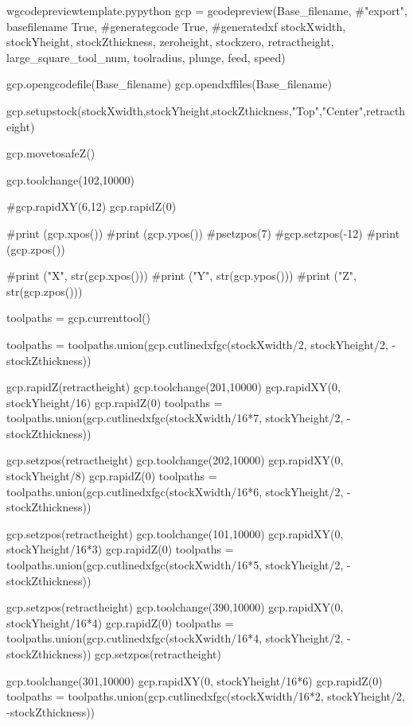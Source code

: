 \documentclass{ltxdoc}
\begin{document}
\begin{writecode}{w}{gcodepreviewtemplate.py}{python}
gcp = gcodepreview(Base_filename, #"export", basefilename
                   True, #generategcode
                   True, #generatedxf
                   stockXwidth, 
                   stockYheight, 
                   stockZthickness, 
                   zeroheight, 
                   stockzero, 
                   retractheight, 
                   large_square_tool_num,
                   toolradius,
                   plunge,
                   feed,
                   speed)

gcp.opengcodefile(Base_filename)
gcp.opendxffiles(Base_filename)

gcp.setupstock(stockXwidth,stockYheight,stockZthickness,"Top","Center",retractheight)

gcp.movetosafeZ()

gcp.toolchange(102,10000)

#gcp.rapidXY(6,12)
gcp.rapidZ(0)

#print (gcp.xpos())
#print (gcp.ypos())
#psetzpos(7)
#gcp.setzpos(-12)
#print (gcp.zpos())

#print ("X", str(gcp.xpos()))
#print ("Y", str(gcp.ypos()))
#print ("Z", str(gcp.zpos()))

toolpaths = gcp.currenttool()

toolpaths = toolpaths.union(gcp.cutlinedxfgc(stockXwidth/2, stockYheight/2, -stockZthickness))

gcp.rapidZ(retractheight)
gcp.toolchange(201,10000)
gcp.rapidXY(0, stockYheight/16)
gcp.rapidZ(0)
toolpaths = toolpaths.union(gcp.cutlinedxfgc(stockXwidth/16*7, stockYheight/2, -stockZthickness))

gcp.setzpos(retractheight)
gcp.toolchange(202,10000)
gcp.rapidXY(0, stockYheight/8)
gcp.rapidZ(0)
toolpaths = toolpaths.union(gcp.cutlinedxfgc(stockXwidth/16*6, stockYheight/2, -stockZthickness))

gcp.setzpos(retractheight)
gcp.toolchange(101,10000)
gcp.rapidXY(0, stockYheight/16*3)
gcp.rapidZ(0)
toolpaths = toolpaths.union(gcp.cutlinedxfgc(stockXwidth/16*5, stockYheight/2, -stockZthickness))

gcp.setzpos(retractheight)
gcp.toolchange(390,10000)
gcp.rapidXY(0, stockYheight/16*4)
gcp.rapidZ(0)
toolpaths = toolpaths.union(gcp.cutlinedxfgc(stockXwidth/16*4, stockYheight/2, -stockZthickness))
gcp.setzpos(retractheight)

gcp.toolchange(301,10000)
gcp.rapidXY(0, stockYheight/16*6)
gcp.rapidZ(0)
toolpaths = toolpaths.union(gcp.cutlinedxfgc(stockXwidth/16*2, stockYheight/2, -stockZthickness))


\end{writecode}
\end{document}
